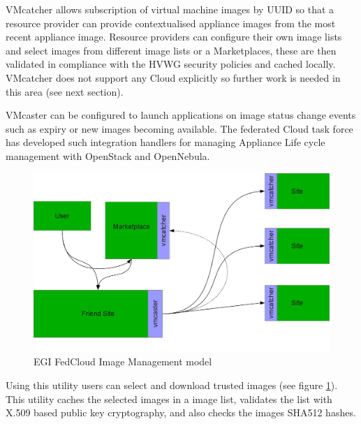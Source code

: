 \documentclass{cai}
\begin{document}
VMcatcher allows subscription of virtual machine images by UUID so that a resource provider can provide contextualised appliance images from the most recent appliance image. Resource providers can configure their own image lists and select images from different image lists or a Marketplaces, these are then validated in compliance with the HVWG security policies and cached locally. 
VMcatcher does not support any Cloud explicitly so further work is needed in this area (see next section).

VMcaster can be configured to launch applications on image status change events such as expiry or new images becoming available. The federated Cloud task force has developed such integration handlers for managing Appliance Life cycle management with OpenStack and OpenNebula.
\begin{figure}
\centering
\includegraphics[width=1\textwidth]{egi_model.png}
\caption{EGI FedCloud Image Management model}
\label{fig:egimodel}
\end{figure}

Using this utility users can select and download trusted images (see figure \ref{fig:egimodel}).
This utility caches the selected images in a image list, validates the list with X.509 based public key cryptography, and also checks the images SHA512 hashes. 
\end{document}

